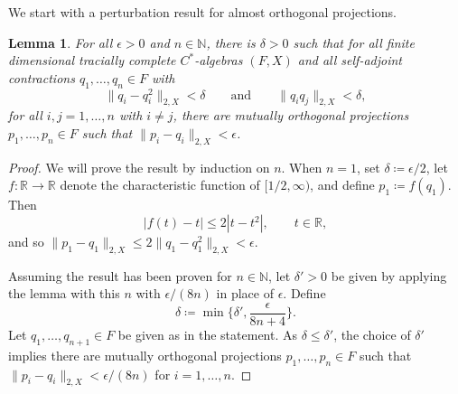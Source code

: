 \documentclass[a4paper,11pt]{amsart}
\newtheorem{lemma}[theorem]{Lemma}
\theoremstyle{definition}
\numberwithin{equation}{section}
\numberwithin{theorem}{section}
\newcommand{\N}{\mathbb N}
\begin{document}
We start with a perturbation result for almost orthogonal projections.

\begin{lemma}
	\label{lem:orthogonal-projections}
	For all $\epsilon > 0$ and $n \in \N$, there is $\delta > 0$ such that for all finite dimensional tracially complete $C^*$-algebras $(F, X)$ and all self-adjoint contractions $q_1, \ldots, q_n \in F$ with
	\begin{equation}
		\| q_i - q_i^2 \|_{2, X} < \delta \qquad \text{and} \qquad \|q_i q_j\|_{2, X} < \delta,
	\end{equation}
	for all $i, j = 1, \ldots, n$ with $i \neq j$, there are mutually orthogonal projections $p_1, \ldots, p_n \in F$ such that $\|p_i - q_i\|_{2, X} < \epsilon$.
\end{lemma}

\begin{proof}
	We will prove the result by induction on $n$.  When $n = 1$, set $\delta \coloneqq \epsilon/2$, let $f \colon \mathbb R \rightarrow \mathbb R$ denote the characteristic function of $[1/2, \infty)$, and define $p_1 \coloneqq f(q_1)$.  Then
	\begin{equation}
		|f(t) - t| \leq 2 |t - t^2|, \qquad t \in \mathbb R,
	\end{equation}
	and so $\|p_1 - q_1\|_{2, X} \leq 2 \|q_1 - q_1^2\|_{2, X} < \epsilon$.
	
	Assuming the result has been proven for $n \in \mathbb N$, let $\delta' > 0$ be given by applying the lemma with this $n$ with $\epsilon/(8n)$ in place of $\epsilon$.  Define
	\begin{equation}
		\delta \coloneqq \min\Big\{ \delta', \frac{\epsilon}{8n+4} \Big\}.
	\end{equation}
	Let $q_1, \ldots, q_{n+1} \in F$ be given as in the statement.  As $\delta \leq \delta'$, the choice of $\delta'$ implies there are mutually orthogonal projections $p_1, \ldots, p_n \in F$ such that $\|p_i - q_i\|_{2, X} < \epsilon/(8n)$ for $i = 1, \ldots, n$.
	

\end{proof}
\end{document}
